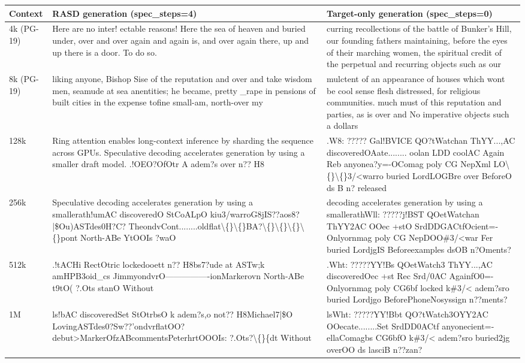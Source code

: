 \begin{tabular}{p{}>{\raggedright\arraybackslash}p{}>{\raggedright\arraybackslash}p{}}
\toprule
Context & RASD generation (spec\_steps=4) & Target-only generation (spec\_steps=0) \\
\midrule
4k (PG-19) & [...] Here are no inter! ectable reasons! Here the sea of heaven and buried under, over and over again and again is, and over again there, up and up there is a door.  To do so. & [...] curring recollections of the battle of Bunker's Hill, our founding fathers maintaining, before the eyes of their marching women, the spiritual credit of the perpetual and recurring objects such as our \\
8k (PG-19) & [...] liking anyone, Bishop Sise of the reputation and over and take wisdom men, seamude at sea anentities; he became, pretty \_rape in pensions of built cities in the expense tofine small-am, north-over my & [...] mulctent of an appearance of houses which wont be cool sense flesh distressed, for religious communities. much must of this reputation and parties, as is over and No imperative objects such a dollars \\
128k & [...] Ring attention enables long-context inference by sharding the sequence across GPUs. Speculative decoding accelerates generation by using a smaller draft model. .!OEO?OfOtr A adem?s over n?? H8 & [...] .W8: ????? Gal!BVICE QO?tWatchan ThYY...,AC discoveredOAate........ oolan LDD coolAC Again Reb anyonea?y=-OComag poly CG NepXml LO\textbackslash\{\}\textbackslash\{\}3/<warro buried LordLOGBre over BeforeO ds B n? released \\
256k & [...] Speculative decoding accelerates generation by using a smallerath!umAC discoveredO StCoALpO kiu3/warroG8jIS??aos8?|\$Ou)ASTdes0H?C? TheondvCont........oldflat\textbackslash\{\}\textbackslash\{\}BA?\textbackslash\{\}\textbackslash\{\}\textbackslash\{\}\textbackslash\{\}pont North-ABe YtOOIs ?waO & [...] decoding accelerates generation by using a smallerathWll: ?????j!BST QOetWatchan ThYY2AC OOec +stO SrdDDGACtfOcient=-Onlyornmag poly CG NepDOO\#3/<war Fer buried LordjgIS Beforeexamples dsOB n?Oments? \\
512k & [...] .!tACHi RectOtric lockedooett n?? H8bs7?ude at ASTw;k amHPB3oid\_cs JimmyondvrO----------------ionMarkerovn North-ABe t9tO( ?.Ots stanO Without & [...] .Wht: ?????YY!Bs QOetWatch3 ThYY...,AC discoveredOec +st Rec Srd/0AC AgainfO0=-Onlyornmag poly CG6bf locked k\#3/< adem?sro buried Lordjgo BeforePhoneNosyssign n??ments? \\
1M & [...] ls!bAC discoveredSet StOtrbsO k adem?s,o not?? H8Michael7|\$O LovingASTdes0?Sw??'ondvrflatOO? debut>MarkerOfzABcommentsPeterhrtOOOIs: ?.Ots?\textbackslash\{\}\{dt Without & [...] lsWht: ?????YY!Bbt QO?tWatch3OYY2AC OOecate........Set SrdDD0ACtf anyonecient=-ellaComagbs CG6bfO k\#3/< adem?sro buried2jg overOO ds lasciB n??zan? \\
\bottomrule
\end{tabular}
